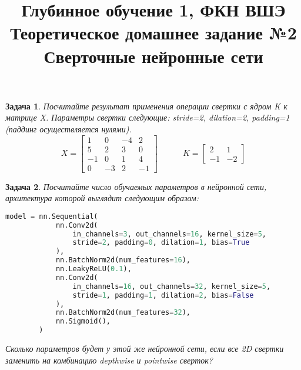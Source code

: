 \documentclass[12pt,fleqn]{article}
\title{Глубинное обучение 1, ФКН ВШЭ\\Теоретическое домашнее задание №2\\Сверточные нейронные сети}
\author{}
\date{}
\newtheorem{esProblem}{Задача}
\begin{document}
\maketitle

\begin{esProblem}
    Посчитайте результат применения операции свертки с ядром K к матрице X. Параметры свертки следующие: stride=2, dilation=2, padding=1 (паддинг осуществляется нулями).
    $$
    X = \begin{bmatrix}
        1 & 0 & -4 & 2 \\
        5 & 2 & 3 & 0 \\
        -1 & 0 & 1 & 4 \\
        0 & -3 & 2 & -1
    \end{bmatrix}
    \quad\quad\quad
    K = \begin{bmatrix}
        2 & 1 \\
        -1 & -2 
    \end{bmatrix}
    $$
\end{esProblem}

\begin{esProblem}
    Посчитайте число обучаемых параметров в нейронной сети, архитектура которой выглядит следующим образом:
    \begin{center}
        \begin{lstlisting}[language=Python]
        model = nn.Sequential(
            nn.Conv2d(
                in_channels=3, out_channels=16, kernel_size=5,
                stride=2, padding=0, dilation=1, bias=True
            ),
            nn.BatchNorm2d(num_features=16),
            nn.LeakyReLU(0.1),
            nn.Conv2d(
                in_channels=16, out_channels=32, kernel_size=5,
                stride=1, padding=1, dilation=2, bias=False
            ),
            nn.BatchNorm2d(num_features=32),
            nn.Sigmoid(),
        )
        \end{lstlisting}
    \end{center}
    
    \vspace{-1.5\baselineskip}
    \noindent
    Сколько параметров будет у этой же нейронной сети, если все 2D свертки заменить на комбинацию depthwise и pointwise сверток?
\end{esProblem}
\end{document}
